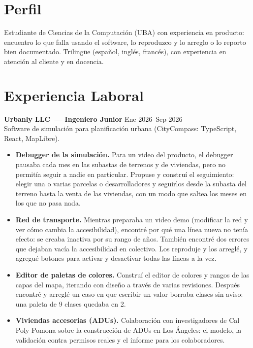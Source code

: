 

\section*{Perfil}
Estudiante de Ciencias de la Computación (UBA) con experiencia en producto: encuentro lo que falla
usando el software, lo reproduzco y lo arreglo o lo reporto bien documentado.
Trilingüe (español, inglés, francés), con experiencia en atención al cliente y en docencia.

\section*{Experiencia Laboral}
\textbf{Urbanly LLC~--- Ingeniero Junior} \hfill Ene 2026--Sep 2026 \\
Software de simulación para planificación urbana (CityCompass: TypeScript, React, MapLibre).
\begin{itemize}
  \item \textbf{Debugger de la simulación.} Para un video del producto, el debugger pausaba cada mes en las
        subastas de terrenos y de viviendas, pero no permitía seguir a nadie en particular. Propuse y construí el
        seguimiento: elegir una o varias parcelas o desarrolladores y seguirlos desde la subasta del terreno hasta
        la venta de las viviendas, con un modo que saltea los meses en los que no pasa nada.
  \item \textbf{Red de transporte.} Mientras preparaba un video demo (modificar la red y ver cómo cambia la
        accesibilidad), encontré por qué una línea nueva no tenía efecto: se creaba inactiva por su rango de años.
        También encontré dos errores que dejaban vacía la accesibilidad en colectivo. Los reproduje y los arreglé,
        y agregué botones para activar y desactivar todas las líneas a la vez.
  \item \textbf{Editor de paletas de colores.} Construí el editor de colores y rangos de las capas del mapa,
        iterando con diseño a través de varias revisiones. Después encontré y arreglé un caso en que escribir un
        valor borraba clases sin aviso: una paleta de 9 clases quedaba en 2.
  \item \textbf{Viviendas accesorias (ADUs).} Colaboración con investigadores de Cal Poly Pomona sobre la
        construcción de ADUs en Los Ángeles: el modelo, la validación contra permisos reales y el informe para
        los colaboradores.
\end{itemize}

